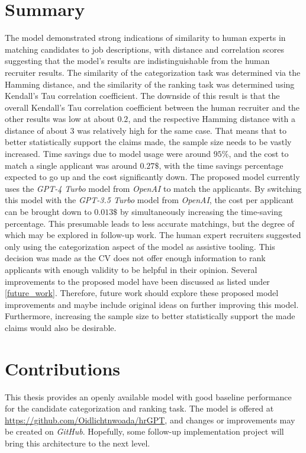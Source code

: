 \documentclass[draft,final]{thesisclass} %
\begin{document}
\section{Summary}
The model demonstrated strong indications of similarity to human experts in matching candidates to job descriptions, with distance and correlation scores suggesting that the model's results are indistinguishable from the human recruiter results. The similarity of the categorization task was determined via the Hamming distance, and the similarity of the ranking task was determined using Kendall's Tau correlation coefficient. The downside of this result is that the overall Kendall's Tau correlation coefficient between the human recruiter and the other results was low at about $0.2$, and the respective Hamming distance with a distance of about $3$ was relatively high for the same case. That means that to better statistically support the claims made, the sample size needs to be vastly increased. Time savings due to model usage were around $95\%$, and the cost to match a single applicant was around $0.27\$$, with the time savings percentage expected to go up and the cost significantly down. The proposed model currently uses the \textit{GPT-4 Turbo} model from \textit{OpenAI} to match the applicants. By switching this model with the \textit{GPT-3.5 Turbo} model from \textit{OpenAI}, the cost per applicant can be brought down to $0.013\$$ by simultaneously increasing the time-saving percentage. This presumable leads to less accurate matchings, but the degree of which may be explored in follow-up work. The human expert recruiters suggested only using the categorization aspect of the model as assistive tooling. This decision was made as the \acs{CV} does not offer enough information to rank applicants with enough validity to be helpful in their opinion. Several improvements to the proposed model have been discussed as listed under \ref{future_work}. Therefore, future work should explore these proposed model improvements and maybe include original ideas on further improving this model. Furthermore, increasing the sample size to better statistically support the made claims would also be desirable.

\section{Contributions}
This thesis provides an openly available model with good baseline performance for the candidate categorization and ranking task. The model is offered at \url{https://github.com/Oidlichtnwoada/hrGPT}, and changes or improvements may be created on \textit{GitHub}. Hopefully, some follow-up implementation project will bring this architecture to the next level. 
\end{document}
